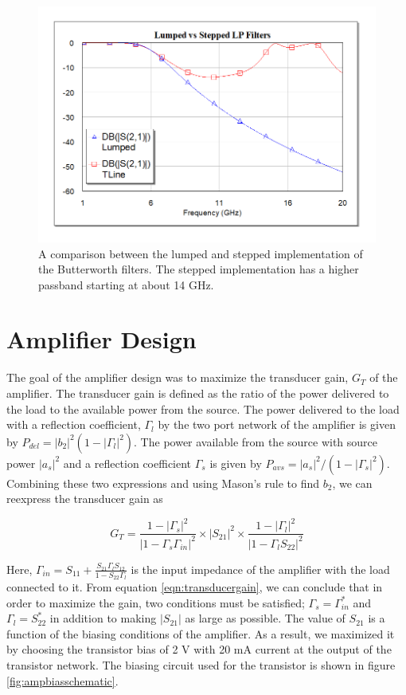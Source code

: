 \documentclass[twocolumn, aps, floatfix]{revtex4-1}
\begin{document}
\begin{figure}
    \centering
    \includegraphics[scale=0.4]{lumped_vs_stepped.png}
    \caption{A comparison between the lumped and stepped implementation of the Butterworth filters. The stepped implementation has a higher passband starting at about 14 GHz.}
    \label{fig:lumpedvsstepped}
\end{figure}

\section*{Amplifier Design}\label{sec:ampdesign}
The goal of the amplifier design was to maximize the transducer gain, $G_T$ of the amplifier. The transducer gain is defined as the ratio of the power delivered to the load to the available power from the source. The power delivered to the load with a reflection coefficient, $\Gamma_l$ by the two port network of the amplifier is given by $P_{del} = |b_2|^2 \left(1 - |\Gamma_l|^2\right) $. The power available from the source with source power $|a_s|^2$ and a reflection coefficient $\Gamma_s$ is given by $P_{avs} = |a_s|^2 /\left(1 - |\Gamma_s|^2 \right)$. Combining these two expressions and using Mason's rule to find $b_2$, we can reexpress the transducer gain as 

\begin{equation}
    G_T = \frac{1 - |\Gamma_s|^2}{|1 - \Gamma_s \Gamma_{in}|^2} \times |S_{21}|^2 \times \frac{1  - |\Gamma_l|^2}{|1 - \Gamma_l S_{22}|^2}
    \label{eqn:transducergain}
\end{equation}

Here, $\Gamma_{in} = S_{11} + \frac{S_{21} \Gamma_l S_{12}}{1 - S_{22} \Gamma_l}$ is the input impedance of the amplifier with the load connected to it. From equation \ref{eqn:transducergain}, we can conclude that in order to maximize the gain, two conditions must be satisfied; $\Gamma_s = \Gamma_{in}^*$ and $\Gamma_l = S_{22}^*$ in addition to making $|S_{21}|$ as large as possible. The value of $S_{21}$ is a function of the biasing conditions of the amplifier. As a result, we maximized it by choosing the transistor bias of 2 V with 20 mA current at the output of the transistor network. The biasing circuit used for the transistor is shown in figure \ref{fig:ampbiasschematic}. 
\end{document}
